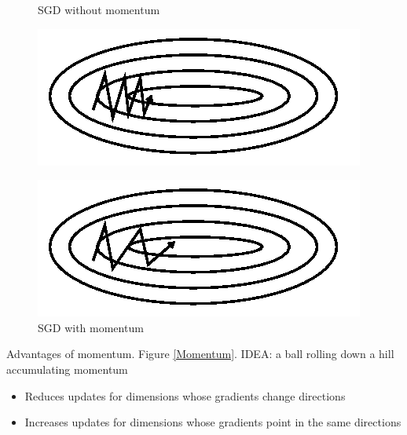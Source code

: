 \documentclass[english]{article}
\begin{document}
\begin{figure}
\centering
\begin{minipage}{.5\textwidth}
  \centering
  \caption{SGD without momentum}
  \includegraphics[width=\textwidth]{without_momentum.png}
    \label{SGD with momentum}
\end{minipage}%
\begin{minipage}{.5\textwidth}
  \centering
  \caption{SGD with momentum}
  \includegraphics[width=\textwidth]{with_momentum.png}
\end{minipage}
\end{figure}














\item {Advantages of momentum}. Figure \ref{Momentum}.
IDEA: a ball rolling down a hill accumulating momentum
\begin{itemize}
\item Reduces updates for dimensions whose gradients change directions
\item Increases updates for dimensions whose gradients point in the same directions
\end{itemize}
\end{document}

